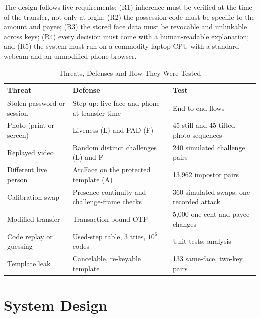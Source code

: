 \documentclass{ieeeaccess}
\begin{document}
The design follows five requirements: (R1) inherence must be verified at the time of the transfer, not
only at login; (R2) the possession code must be specific to the amount and payee; (R3) the stored face
data must be revocable and unlinkable across keys; (R4) every decision must come with a
human-readable explanation; and (R5) the system must run on a commodity laptop CPU with a standard
webcam and an unmodified phone browser.

\begin{table}[!t]
\caption{Threats, Defenses and How They Were Tested}
\label{tab:threats}
\centering
\footnotesize
\setlength{\tabcolsep}{3pt}
\begin{tabular}{p{2.1cm}p{3.0cm}p{2.6cm}}
\toprule
Threat & Defense & Test \\
\midrule
Stolen password or session & Step-up: live face and phone at transfer time & End-to-end flows \\
Photo (print or screen) & Liveness (L) and PAD (F) & 45 still and 45 tilted photo sequences \\
Replayed video & Random distinct challenges (L) and F & 240 simulated challenge pairs \\
Different live person & ArcFace on the protected template (A) & 13,962 impostor pairs \\
Calibration swap & Presence continuity and challenge-frame checks & 360 simulated swaps; one recorded attack \\
Modified transfer & Transaction-bound OTP & 5,000 one-cent and payee changes \\
Code replay or guessing & Used-step table, 3 tries, $10^6$ codes & Unit tests; analysis \\
Template leak & Cancelable, re-keyable template & 133 same-face, two-key pairs \\
\bottomrule
\end{tabular}
\end{table}

\section{System Design}
\label{sec:design}
\end{document}
